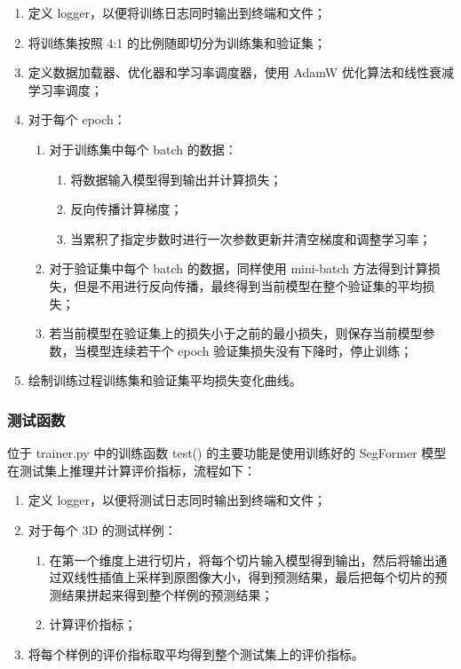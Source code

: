 \documentclass[hyperref,a4paper,UTF8]{ctexart}
\begin{document}
\begin{enumerate}[itemsep=2pt,topsep=0pt,parsep=0pt]
    \item 定义 logger，以便将训练日志同时输出到终端和文件；
    \item 将训练集按照 4:1 的比例随即切分为训练集和验证集；
    \item 定义数据加载器、优化器和学习率调度器，使用 AdamW 优化算法和线性衰减学习率调度；
    \item 对于每个 epoch：
    \begin{enumerate}[itemsep=2pt,topsep=0pt,parsep=0pt]
        \item 对于训练集中每个 batch 的数据：
        \begin{enumerate}[itemsep=2pt,topsep=0pt,parsep=0pt]
            \item 将数据输入模型得到输出并计算损失；
            \item 反向传播计算梯度；
            \item 当累积了指定步数时进行一次参数更新并清空梯度和调整学习率；
        \end{enumerate}
        \item 对于验证集中每个 batch 的数据，同样使用 mini-batch 方法得到计算损失，但是不用进行反向传播，最终得到当前模型在整个验证集的平均损失；
        \item 若当前模型在验证集上的损失小于之前的最小损失，则保存当前模型参数，当模型连续若干个 epoch 验证集损失没有下降时，停止训练；
    \end{enumerate}
    \item 绘制训练过程训练集和验证集平均损失变化曲线。
\end{enumerate}

\subsubsection{测试函数}

位于 trainer.py 中的训练函数 test() 的主要功能是使用训练好的 SegFormer 模型在测试集上推理并计算评价指标，流程如下：

\begin{enumerate}[itemsep=2pt,topsep=0pt,parsep=0pt]
    \item 定义 logger，以便将测试日志同时输出到终端和文件；
    \item 对于每个 3D 的测试样例：
    \begin{enumerate}[itemsep=2pt,topsep=0pt,parsep=0pt]
        \item 在第一个维度上进行切片，将每个切片输入模型得到输出，然后将输出通过双线性插值上采样到原图像大小，得到预测结果，最后把每个切片的预测结果拼起来得到整个样例的预测结果；
        \item 计算评价指标；
    \end{enumerate}
    \item 将每个样例的评价指标取平均得到整个测试集上的评价指标。
\end{enumerate}
\end{document}
